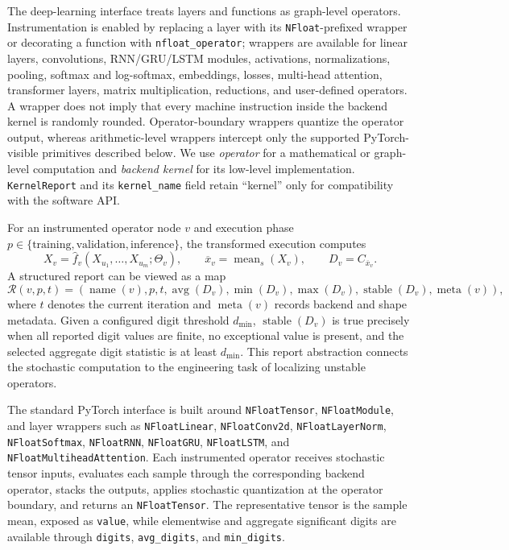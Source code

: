 \documentclass[manuscript, screen]{acmart}
\begin{document}
The deep-learning interface treats layers and functions as graph-level operators. Instrumentation is enabled by replacing a layer with its \texttt{NFloat}-prefixed wrapper or decorating a function with \texttt{nfloat\_operator}; wrappers are available for linear layers, convolutions, RNN/GRU/LSTM modules, activations, normalizations, pooling, softmax and log-softmax, embeddings, losses, multi-head attention, transformer layers, matrix multiplication, reductions, and user-defined operators. A wrapper does not imply that every machine instruction inside the backend kernel is randomly rounded. Operator-boundary wrappers quantize the operator output, whereas arithmetic-level wrappers intercept only the supported PyTorch-visible primitives described below. We use \emph{operator} for a mathematical or graph-level computation and \emph{backend kernel} for its low-level implementation. \texttt{KernelReport} and its \texttt{kernel\_name} field retain ``kernel'' only for compatibility with the software API.

For an instrumented operator node $v$ and execution phase $p\in\{\text{training},\text{validation},\text{inference}\}$, the transformed execution computes
\begin{equation}
X_v=\widehat{f}_v(X_{u_1},\ldots,X_{u_m};\Theta_v),
\qquad
\overline{x}_v=\operatorname{mean}_s(X_v),
\qquad
D_v=C_{\overline{x}_v}.
\end{equation}
A structured report can be viewed as a map
\begin{equation}
\mathcal{R}(v,p,t)=
\left(
\operatorname{name}(v),p,t,
\operatorname{avg}(D_v),
\operatorname{min}(D_v),
\operatorname{max}(D_v),
\operatorname{stable}(D_v),
\operatorname{meta}(v)
\right),
\end{equation}
where $t$ denotes the current iteration and $\operatorname{meta}(v)$ records backend and shape metadata. Given a configured digit threshold $d_{\min}$, $\operatorname{stable}(D_v)$ is true precisely when all reported digit values are finite, no exceptional value is present, and the selected aggregate digit statistic is at least $d_{\min}$. This report abstraction connects the stochastic computation to the engineering task of localizing unstable operators.

The standard PyTorch interface is built around \texttt{NFloatTensor}, \texttt{NFloatModule}, and layer wrappers such as \texttt{NFloatLinear}, \texttt{NFloatConv2d}, \texttt{NFloatLayerNorm}, \texttt{NFloatSoftmax}, \texttt{NFloatRNN}, \texttt{NFloatGRU}, \texttt{NFloatLSTM}, and \texttt{NFloatMultiheadAttention}. Each instrumented operator receives stochastic tensor inputs, evaluates each sample through the corresponding backend operator, stacks the outputs, applies stochastic quantization at the operator boundary, and returns an \texttt{NFloatTensor}. The representative tensor is the sample mean, exposed as \texttt{value}, while elementwise and aggregate significant digits are available through \texttt{digits}, \texttt{avg\_digits}, and \texttt{min\_digits}.
\end{document}
